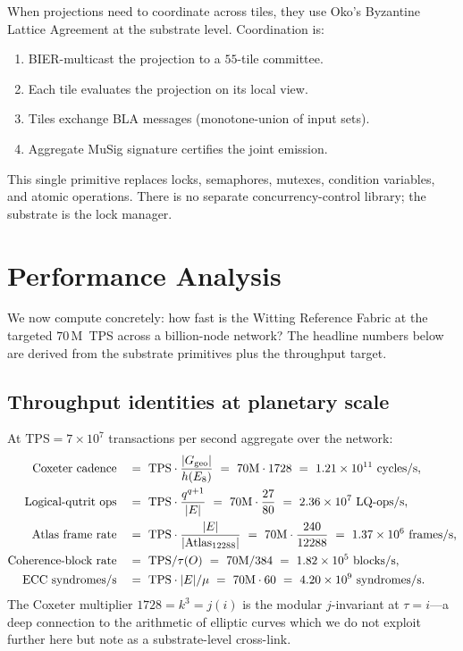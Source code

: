 \documentclass[11pt,letterpaper]{article}
\theoremstyle{remark}
\newcommand{\Atlas}{\mathrm{Atlas}_{12288}}
\newcommand{\TPS}{\mathrm{TPS}}
\begin{document}
When projections need to coordinate across tiles, they use Oko's Byzantine Lattice
Agreement at the substrate level. Coordination is:
\begin{enumerate}[leftmargin=2em,nosep]
\item BIER-multicast the projection to a $55$-tile committee.
\item Each tile evaluates the projection on its local view.
\item Tiles exchange BLA messages (monotone-union of input sets).
\item Aggregate MuSig signature certifies the joint emission.
\end{enumerate}
This single primitive replaces locks, semaphores, mutexes, condition variables, and
atomic operations. There is no separate concurrency-control library; the substrate is
the lock manager.

\section{Performance Analysis}

\begin{plainenglish}
We now compute concretely: how fast is the Witting Reference Fabric at the targeted $70$\,M~TPS
across a billion-node network? The headline numbers below are derived from the substrate
primitives plus the throughput target.
\end{plainenglish}

\subsection{Throughput identities at planetary scale}

At $\TPS = 7 \times 10^7$ transactions per second aggregate over the network:
\begin{align}
\text{Coxeter cadence} \quad &=\ \TPS \cdot \frac{|G_{\rm geo}|}{h(E_8)}
\ =\ 70\text{M}\cdot 1728\ =\ 1.21 \times 10^{11}\ \text{cycles/s},\\
\text{Logical-qutrit ops} \quad &=\ \TPS \cdot \frac{q^{q+1}}{|E|}
\ =\ 70\text{M}\cdot \frac{27}{80}\ =\ 2.36 \times 10^7\ \text{LQ-ops/s},\\
\text{Atlas frame rate}    \quad &=\ \TPS \cdot \frac{|E|}{|\Atlas|}
\ =\ 70\text{M} \cdot \frac{240}{12288}\ =\ 1.37 \times 10^6\ \text{frames/s},\\
\text{Coherence-block rate}\quad &=\ \TPS / \tau(O)
\ =\ 70\text{M} / 384\ =\ 1.82 \times 10^5\ \text{blocks/s},\\
\text{ECC syndromes/s}    \quad &=\ \TPS \cdot |E| / \mu
\ =\ 70\text{M} \cdot 60\ =\ 4.20 \times 10^9\ \text{syndromes/s}.
\end{align}
The Coxeter multiplier $1728 = k^3 = j(i)$ is the modular $j$-invariant at $\tau = i$---a
deep connection to the arithmetic of elliptic curves which we do not exploit further
here but note as a substrate-level cross-link.
\end{document}
